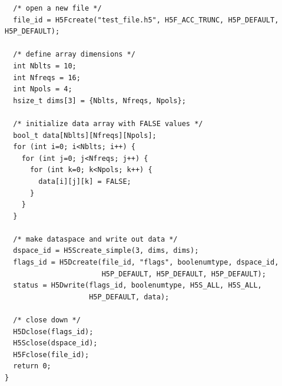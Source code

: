 \documentclass[11pt, oneside]{article}
\begin{document}
\begin{appendices}
\begin{verbatim}
  /* open a new file */
  file_id = H5Fcreate("test_file.h5", H5F_ACC_TRUNC, H5P_DEFAULT, H5P_DEFAULT);

  /* define array dimensions */
  int Nblts = 10;
  int Nfreqs = 16;
  int Npols = 4;
  hsize_t dims[3] = {Nblts, Nfreqs, Npols};

  /* initialize data array with FALSE values */
  bool_t data[Nblts][Nfreqs][Npols];
  for (int i=0; i<Nblts; i++) {
    for (int j=0; j<Nfreqs; j++) {
      for (int k=0; k<Npols; k++) {
        data[i][j][k] = FALSE;
      }
    }
  }

  /* make dataspace and write out data */
  dspace_id = H5Screate_simple(3, dims, dims);
  flags_id = H5Dcreate(file_id, "flags", boolenumtype, dspace_id,
                       H5P_DEFAULT, H5P_DEFAULT, H5P_DEFAULT);
  status = H5Dwrite(flags_id, boolenumtype, H5S_ALL, H5S_ALL,
                    H5P_DEFAULT, data);

  /* close down */
  H5Dclose(flags_id);
  H5Sclose(dspace_id);
  H5Fclose(file_id);
  return 0;
}
\end{verbatim}


\end{appendices}
\end{document}
